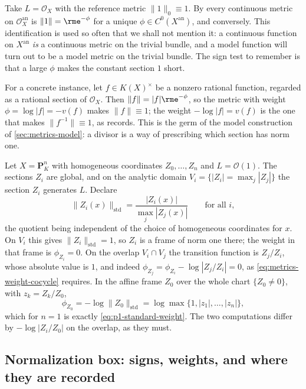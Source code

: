 \begin{example}
\label{ex:metrics-trivial-bundle}
Take $L=\mathcal O_X$ with the reference metric $\|1\|_0\equiv1$. By
 every continuous metric on
$\mathcal O_X^{\mathrm{an}}$ is $\|1\|=\rme^{-\phi}$ for a unique
$\phi\in C^0(X^{\mathrm{an}})$, and conversely. This identification is
used so often that we shall not mention it: a continuous function on
$X^{\mathrm{an}}$ \emph{is} a continuous metric on the trivial bundle, and
a model function will turn out to be a model metric on the trivial bundle.
The sign test to remember is that a large $\phi$ makes the constant
section $1$ short.

For a concrete instance, let $f\in K(X)^\times$ be a nonzero rational
function, regarded as a rational section of $\mathcal O_X$. Then
$\|f\|=|f|\rme^{-\phi}$, so the metric with weight
$\phi=\log|f|=-v(f)$ makes $\|f\|\equiv1$; the weight $-\log|f|=v(f)$
is the one that makes $\|f^{-1}\|\equiv1$, as
 records.  This is the germ of the model
construction of
\cref{sec:metrics-model}: a divisor is a way of prescribing which section
has norm one.
\end{example}

\begin{example}
\label{ex:metrics-standard-projective-frames}
Let $X=\mathbf P^n_K$ with homogeneous coordinates $Z_0,\ldots,Z_n$ and
$L=\mathcal O(1)$. The sections $Z_i$ are global, and on the analytic
domain $V_i=\{|Z_i|=\max_j|Z_j|\}$ the section $Z_i$ generates $L$.
Declare
\[
 \|Z_i(x)\|_{\mathrm{std}}
 =\frac{|Z_i(x)|}{\max_j|Z_j(x)|}
 \qquad\text{for all }i,
\]
the quotient being independent of the choice of homogeneous coordinates for
$x$. On $V_i$ this gives $\|Z_i\|_{\mathrm{std}}=1$, so $Z_i$ is a
frame of norm one there; the weight in that frame is
$\phi_{Z_i}=0$. On the overlap $V_i\cap V_j$ the transition function is
$Z_j/Z_i$, whose absolute value is $1$, and indeed
$\phi_{Z_j}=\phi_{Z_i}-\log|Z_j/Z_i|=0$, as
\eqref{eq:metrics-weight-cocycle} requires. In the affine frame $Z_0$ over
the whole chart $\{Z_0\ne0\}$, with $z_k=Z_k/Z_0$,
\[
 \phi_{Z_0}=-\log\|Z_0\|_{\mathrm{std}}
 =\log\max\{1,|z_1|,\ldots,|z_n|\},
\]
which for $n=1$ is exactly \eqref{eq:p1-standard-weight}. The two
computations differ by $-\log|Z_i/Z_0|$ on the overlap, as they must.
\end{example}

\subsection*{Normalization box: signs, weights, and where they are recorded}

